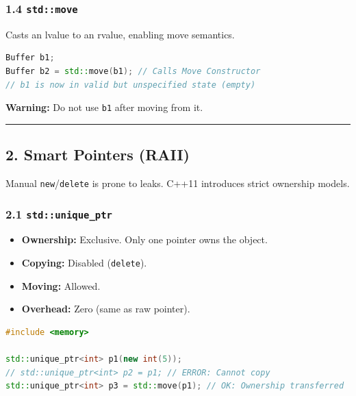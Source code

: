 \hypertarget{stdmove}{%
\subsubsection{\texorpdfstring{1.4
\texttt{std::move}}{1.4 std::move}}\label{stdmove}}

Casts an lvalue to an rvalue, enabling move semantics.

\begin{lstlisting}[language={C++}]
Buffer b1;
Buffer b2 = std::move(b1); // Calls Move Constructor
// b1 is now in valid but unspecified state (empty)
\end{lstlisting}

\textbf{Warning:} Do not use \passthrough{\lstinline!b1!} after moving
from it.

\begin{center}\rule{0.5\linewidth}{0.5pt}\end{center}

\hypertarget{smart-pointers-raii}{%
\subsection{2. Smart Pointers (RAII)}\label{smart-pointers-raii}}

Manual \passthrough{\lstinline!new!}/\passthrough{\lstinline!delete!} is
prone to leaks. C++11 introduces strict ownership models.

\hypertarget{stdunique_ptr}{%
\subsubsection{\texorpdfstring{2.1
\texttt{std::unique\_ptr}}{2.1 std::unique\_ptr}}\label{stdunique_ptr}}

\begin{itemize}
\tightlist
\item
  \textbf{Ownership:} Exclusive. Only one pointer owns the object.
\item
  \textbf{Copying:} Disabled (\passthrough{\lstinline!delete!}).
\item
  \textbf{Moving:} Allowed.
\item
  \textbf{Overhead:} Zero (same as raw pointer).
\end{itemize}

\begin{lstlisting}[language={C++}]
#include <memory>

std::unique_ptr<int> p1(new int(5));
// std::unique_ptr<int> p2 = p1; // ERROR: Cannot copy
std::unique_ptr<int> p3 = std::move(p1); // OK: Ownership transferred
\end{lstlisting}

